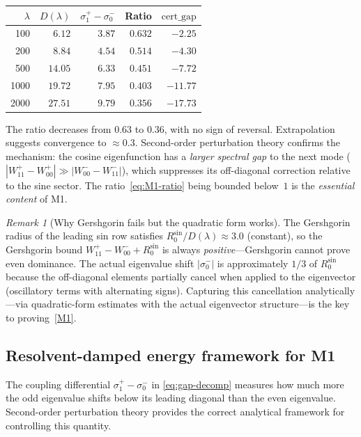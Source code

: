 \documentclass[12pt,a4paper]{article}
\theoremstyle{definition}
\theoremstyle{remark}
\newtheorem{remark}[theorem]{Remark}
\begin{document}
\begin{center}
\small
\renewcommand{\arraystretch}{1.15}
\begin{tabular}{r|r|r|r|r}
$\lambda$ & $D(\lambda)$ & $\sigma_1^+\! -\! \sigma_0^-$ & Ratio & $\mathrm{cert\_gap}$ \\\hline
100  & $6.12$  & $3.87$ & $0.632$ & $-2.25$ \\
200  & $8.84$  & $4.54$ & $0.514$ & $-4.30$ \\
500  & $14.05$ & $6.33$ & $0.451$ & $-7.72$ \\
1000 & $19.72$ & $7.95$ & $0.403$ & $-11.77$ \\
2000 & $27.51$ & $9.79$ & $0.356$ & $-17.73$
\end{tabular}
\end{center}

\noindent The ratio decreases from $0.63$ to $0.36$, with no sign of reversal. Extrapolation suggests convergence to $\approx 0.3$. Second-order perturbation theory confirms the mechanism: the cosine eigenfunction has a \emph{larger spectral gap} to the next mode ($|W_{11}^+ - W_{00}^+| \gg |W_{00}^- - W_{11}^-|$), which suppresses its off-diagonal correction relative to the sine sector. The ratio~\eqref{eq:M1-ratio} being bounded below~$1$ is the \emph{essential content} of M1.

\begin{remark}[Why Gershgorin fails but the quadratic form works]
The Gershgorin radius of the leading sin row satisfies $R_0^{\sin}/D(\lambda) \approx 3.0$ (constant), so the Gershgorin bound $W_{11}^+ - W_{00}^- + R_0^{\sin}$ is always \emph{positive}---Gershgorin cannot prove even dominance. The actual eigenvalue shift $|\sigma_0^-|$ is approximately $1/3$ of $R_0^{\sin}$ because the off-diagonal elements partially cancel when applied to the eigenvector (oscillatory terms with alternating signs). Capturing this cancellation analytically---via quadratic-form estimates with the actual eigenvector structure---is the key to proving~\ref{M1}.
\end{remark}


\subsection{Resolvent-damped energy framework for M1}
\label{sec:resolvent-M1}

The coupling differential $\sigma_1^+ - \sigma_0^-$ in \eqref{eq:gap-decomp} measures how much more the odd eigenvalue shifts below its leading diagonal than the even eigenvalue. Second-order perturbation theory provides the correct analytical framework for controlling this quantity.
\end{document}
